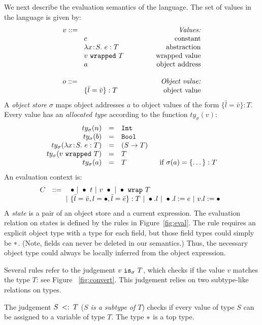 \documentclass{article}
\newcommand{\lam}[4]{\lambda#1\!:\!#2.\,\,#4:#3}
\newcommand{\lamt}[2]{#1\rightarrow #2}
\newcommand{\app}[2]{#1~#2}
\newcommand{\Int}{\t{Int}}
\newcommand{\Bool}{\t{Bool}}
\newcommand{\dynamic}{\t{*}}
\newcommand{\hole}{\bullet}
\newcommand{\subtype}[2]{#1 \,\sword\, #2}
\newcommand{\sword}{\mbox{\,\,$<:$\,\,}}
\renewcommand{\t}[1]{{\tt #1}}
\newcommand{\obje}[2]{\{#1\}:{#2}}
\newcommand{\objget}[2]{#1.#2}
\newcommand{\objset}[3]{#1.#2:=#3}
\newcommand{\wrapv}[2]{#1~\t{wrapped}~#2}
\newcommand{\wrap}[2]{#1~\t{wrap}~#2}
\newcommand{\allocty}[1]{ty_{\sigma}(#1)}
\newcommand{\istype}[2]{#1~\t{is}_{\sigma}~ #2}
\begin{document}
We next describe the evaluation semantics of the language. 
The set of values in the language is given by:
\[
\begin{array}{llr}
	\mydefhead{v ::=\qquad\qquad\qquad\qquad\qquad}{Values:} 
	\mydefcase{c								}{constant} 
	\mydefcase{\lam{x}{S}{T}{e} 				}{abstraction} 
	\mydefcase{\wrapv{v}{T}	 				}{wrapped value} 
	\mydefcase{a								}{object address}
	\\
	\mydefhead{o ::=\qquad\qquad\qquad\qquad\qquad}{Object value:} 
	\mydefcase{\obje{\bar l = \bar v}{T}		}{object value}
\end{array}
\]
A \emph{object store} $\sigma$ maps object addresses $a$ to object values of the form $\obje{\bar{l}=\bar v}{T}$.
Every value has an \emph{allocated type} according to the function $\allocty{v}$:
\[
\begin{array}{rcll}
		\allocty{n}&=&\Int \\
		\allocty{b}&=&\Bool\\
		\allocty{\lam{x}{S}{T}{e}}&=&(\lamt{S}{T})\\
		\allocty{\wrapv{v}{T}}&=&T\\
		\allocty{a}&=&T   &\mbox{~~if } 		\sigma(a)=\obje{\dots}{T}
\end{array}
\]
An evaluation context is:
\[
C ~~::=
\begin{array}[t]{@{}l}
		~~~\hole
	~|~	\app{\hole}{t} 
	~|~	\app{v}{\hole}
	~|~ \wrap{\hole}{T} \\
	~|~ \obje{\bar l=\bar v,l=\hole, \bar l =\bar e}{T}
	~|~ \objget{\hole}{l}
	~|~ \objset{\hole}{l}{e}
	~|~ \objset{v}{l}{\hole} 
\end{array}
\]
A \emph{state} is a pair of an object store and a current expression.
The evaluation relation on states is defined by the rules in Figure~\ref{fig:eval}.
The rule  requires an explicit object type with a type for each field,
but those field types could simply be $\dynamic$. (Note, fields can never be deleted in our semantics.)
Thus, the necessary object type could always be locally inferred from the object expression.

Several rules refer to the judgement $\istype{v}{T}$, which checks if the value $v$ matches the type $T$: 
see  Figure ~\ref{fig:convert}. This judgement relies on two subtype-like relations on types.

The judgement $\subtype{S}{T}$ (\emph{$S$ is a subtype of $T$}) checks if every value of type $S$ 
can be assigned to a variable of type $T$.
The type $\dynamic$ is a top type. 
\end{document}
